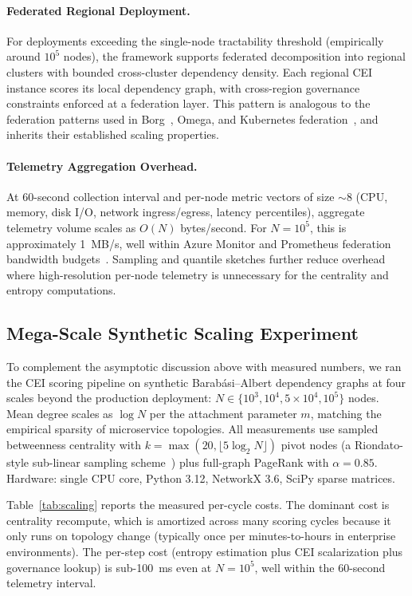 \documentclass[runningheads]{llncs}
\begin{document}
\paragraph{Federated Regional Deployment.}
For deployments exceeding the single-node tractability threshold (empirically around $10^5$ nodes), the framework supports federated decomposition into regional clusters with bounded cross-cluster dependency density. Each regional CEI instance scores its local dependency graph, with cross-region governance constraints enforced at a federation layer. This pattern is analogous to the federation patterns used in Borg~\cite{borg_omega_kubernetes}, Omega, and Kubernetes federation~\cite{verma_kubernetes}, and inherits their established scaling properties.

\paragraph{Telemetry Aggregation Overhead.}
At 60-second collection interval and per-node metric vectors of size $\sim 8$ (CPU, memory, disk I/O, network ingress/egress, latency percentiles), aggregate telemetry volume scales as $O(N)$ bytes/second. For $N = 10^5$, this is approximately 1~MB/s, well within Azure Monitor and Prometheus federation bandwidth budgets~\cite{prometheus_observability}. Sampling and quantile sketches further reduce overhead where high-resolution per-node telemetry is unnecessary for the centrality and entropy computations.

\subsection{Mega-Scale Synthetic Scaling Experiment}
\label{sec:megascale}

To complement the asymptotic discussion above with measured numbers, we ran the CEI scoring pipeline on synthetic Barab\'{a}si--Albert dependency graphs at four scales beyond the production deployment: $N \in \{10^3, 10^4, 5\!\times\!10^4, 10^5\}$ nodes. Mean degree scales as $\log N$ per the attachment parameter $m$, matching the empirical sparsity of microservice topologies. All measurements use sampled betweenness centrality with $k = \max(20, \lfloor 5 \log_2 N \rfloor)$ pivot nodes (a Riondato-style sub-linear sampling scheme~\cite{riondato_centrality}) plus full-graph PageRank with $\alpha = 0.85$. Hardware: single CPU core, Python 3.12, NetworkX 3.6, SciPy sparse matrices.

Table~\ref{tab:scaling} reports the measured per-cycle costs. The dominant cost is centrality recompute, which is amortized across many scoring cycles because it only runs on topology change (typically once per minutes-to-hours in enterprise environments). The per-step cost (entropy estimation plus CEI scalarization plus governance lookup) is sub-100~ms even at $N = 10^5$, well within the 60-second telemetry interval.
\end{document}
